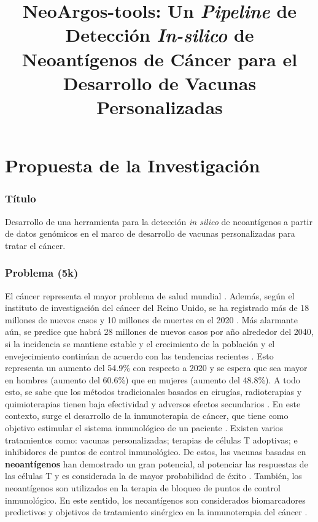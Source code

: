\documentclass[a4paper,11pt]{article}
\title{ 
	
	NeoArgos-tools: Un \textit{Pipeline} de Detección \textit{In-silico} de Neoantígenos de Cáncer para el Desarrollo de Vacunas Personalizadas
}
\author{}
\date{}
\begin{document}
	

	
	
	
	
	
	
	

\part*{Propuesta de la Investigación}

\section{Título}
Desarrollo de una herramienta  para la detección \textit{in silico} de neoantígenos a partir de datos genómicos en el marco de desarrollo de vacunas personalizadas para tratar el cáncer.

\section{Problema (5k) }

El cáncer representa el mayor problema de salud mundial \cite{siegel2023cancer}. Además, según el instituto de investigación del cáncer del Reino Unido, se ha registrado más de 18 millones de nuevos casos y 10 millones de muertes en el 2020 \cite{cancerUK2023}. Más alarmante aún, se predice que habrá 28 millones de nuevos casos por año alrededor del 2040, si la incidencia se mantiene estable y el crecimiento de la población y el envejecimiento continúan de acuerdo con las tendencias recientes \cite{cancerUK2023_2}. Esto representa un aumento del 54.9\% con respecto a 2020 y se espera que sea mayor en hombres (aumento del 60.6\%) que en mujeres (aumento del 48.8\%).	A todo esto, se sabe que los métodos tradicionales basados en cirugías, radioterapias y quimioterapias tienen baja efectividad y adversos efectos secundarios \cite{peng2019neoantigen}. En este contexto, surge el desarrollo de la inmunoterapia de cáncer, que tiene como objetivo estimular el sistema inmunológico de un paciente \cite{borden2022cancer}. Existen varios tratamientos como: vacunas personalizadas; terapias de células T adoptivas; e inhibidores de puntos de control inmunológico. De estos, las vacunas basadas en \textbf{neoantígenos} han demostrado un gran potencial, al potenciar las respuestas de las células T y es considerada la de mayor probabilidad de éxito \cite{borden2022cancer}. También, los neoantígenos son utilizados en la terapia de bloqueo de puntos de control inmunológico. En este sentido, los neoantígenos son considerados biomarcadores predictivos y objetivos de tratamiento sinérgico en la inmunoterapia del cáncer \cite{fang2022neoantigens}.
\end{document}

